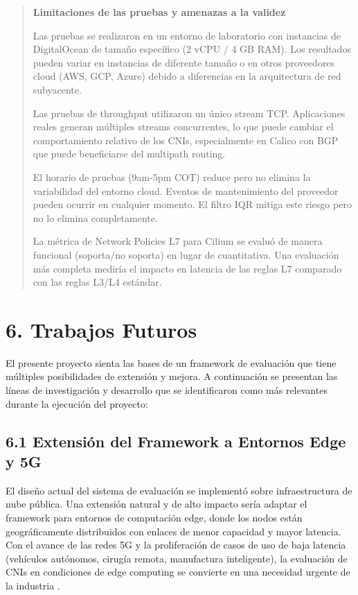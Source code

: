 \documentclass[journal]{IEEEtran}
\begin{document}
\begin{quote}
\textbf{Limitaciones de las pruebas y amenazas a la validez}

Las pruebas se realizaron en un entorno de laboratorio con instancias de DigitalOcean de tamaño específico (2 vCPU / 4 GB RAM). Los resultados pueden variar en instancias de diferente tamaño o en otros proveedores cloud (AWS, GCP, Azure) debido a diferencias en la arquitectura de red subyacente.

Las pruebas de throughput utilizaron un único stream TCP. Aplicaciones reales generan múltiples streams concurrentes, lo que puede cambiar el comportamiento relativo de los CNIs, especialmente en Calico con BGP que puede beneficiarse del multipath routing.

El horario de pruebas (9am-5pm COT) reduce pero no elimina la variabilidad del entorno cloud. Eventos de mantenimiento del proveedor pueden ocurrir en cualquier momento. El filtro IQR mitiga este riesgo pero no lo elimina completamente.

La métrica de Network Policies L7 para Cilium se evaluó de manera funcional (soporta/no soporta) en lugar de cuantitativa. Una evaluación más completa mediría el impacto en latencia de las reglas L7 comparado con las reglas L3/L4 estándar.
\end{quote}



\section{6. Trabajos Futuros}

El presente proyecto sienta las bases de un framework de evaluación que tiene múltiples posibilidades de extensión y mejora. A continuación se presentan las líneas de investigación y desarrollo que se identificaron como más relevantes durante la ejecución del proyecto:

\subsection{6.1 Extensión del Framework a Entornos Edge y 5G}

El diseño actual del sistema de evaluación se implementó sobre infraestructura de nube pública. Una extensión natural y de alto impacto sería adaptar el framework para entornos de computación edge, donde los nodos están geográficamente distribuidos con enlaces de menor capacidad y mayor latencia. Con el avance de las redes 5G y la proliferación de casos de uso de baja latencia (vehículos autónomos, cirugía remota, manufactura inteligente), la evaluación de CNIs en condiciones de edge computing se convierte en una necesidad urgente de la industria \cite{ref1}.
\end{document}
